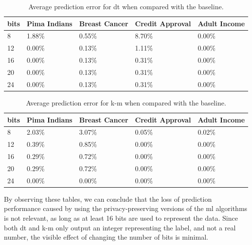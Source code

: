 \begin{table}[H]
\centering
\caption{Average prediction error for \ac{dt} when compared with the baseline.}
\label{table:avgErrorDT}
\begin{tabular}{|l|l|l|l|l|}
\hline
\textbf{bits} & \textbf{Pima Indians} & \textbf{Breast Cancer} & \textbf{Credit Approval} & \textbf{Adult Income} \\ \hline
8    & 1.88\%       & 0.55\%        & 8.70\%          & 0.00\%       \\ \hline
12   & 0.00\%       & 0.13\%        & 1.11\%          & 0.00\%       \\ \hline
16   & 0.00\%       & 0.13\%        & 0.31\%          & 0.00\%       \\ \hline
20   & 0.00\%       & 0.13\%        & 0.31\%          & 0.00\%       \\ \hline
24   & 0.00\%       & 0.13\%        & 0.31\%          & 0.00\%       \\ \hline
\end{tabular}
\end{table}

\begin{table}[H]
\centering
\caption{Average prediction error for \ac{k-m} when compared with the baseline.}
\label{table:avgErrorKM}
\begin{tabular}{|l|l|l|l|l|}
\hline
\textbf{bits} & \textbf{Pima Indians} & \textbf{Breast Cancer} & \textbf{Credit Approval} & \textbf{Adult Income} \\ \hline
8    & 2.03\%       & 3.07\%        &    0.05\%       &     0.02\%   \\ \hline
12   & 0.39\%       & 0.85\%        &    0.00\%       &     0.00\%   \\ \hline
16   & 0.29\%       & 0.72\%        &    0.00\%       &     0.00\%   \\ \hline
20   & 0.29\%       & 0.72\%        &    0.00\%       &     0.00\%   \\ \hline
24   & 0.00\%       & 0.00\%        &    0.00\%       &     0.00\%   \\ \hline
\end{tabular}
\end{table}

By observing these tables, we can conclude that the loss of prediction performance caused by using the privacy-preserving versions of the \ac{ml} algorithms is not relevant, as long as at least 16 bits are used to represent the data. Since both \ac{dt} and \ac{k-m} only output an integer representing the label, and not a real number, the visible effect of changing the number of bits is minimal.

